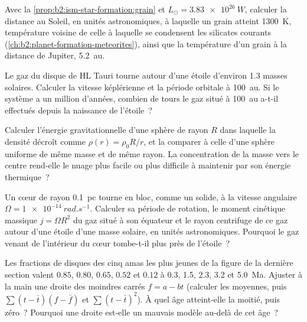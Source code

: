 \begin{exercise}[$\star\star$]\label{exo:b2:ism-star-formation:8}
Avec la \cref{prop:b2:ism-star-formation:grain} et $L_\odot = \qty{3.83e26}{W}$, calculer
la distance au Soleil, en unités astronomiques, à laquelle un grain atteint \qty{1300}{K}, température voisine de celle à laquelle se condensent les silicates courants
(\cref{ch:b2:planet-formation-meteorites}), ainsi que la température d'un grain à la distance de
Jupiter,
\qty{5.2}{au}.
\end{exercise}

\begin{exercise}[$\star\star$]\label{exo:b2:ism-star-formation:9}
Le gaz du disque de HL Tauri tourne autour d'une étoile d'environ \num{1.3} masses
solaires. Calculer la vitesse képlérienne et la période orbitale à \qty{100}{au}. Si le système a un million d'années, combien de tours le gaz situé à \qty{100}{au} a-t-il
effectués depuis la naissance de
l'étoile~?
\end{exercise}

\begin{exercise}[$\star\star\star$]\label{exo:b2:ism-star-formation:10}
Calculer l'énergie gravitationnelle d'une sphère de rayon $R$ dans laquelle la densité
décroît comme $\rho(r) = \rho_0 R/r$, et la comparer à celle d'une sphère uniforme de même masse et de même rayon. La concentration de la masse vers le centre rend-elle le nuage
plus facile ou plus difficile à maintenir par son énergie
thermique~?
\end{exercise}

\begin{exercise}[$\star\star\star$]\label{exo:b2:ism-star-formation:11}
Un cœur de rayon \qty{0.1}{pc} tourne en bloc, comme un solide, à la vitesse angulaire
$\Omega = \qty{1e-14}{rad.s^{-1}}$. Calculer sa période de rotation, le moment cinétique massique $j = \Omega R^2$ du gaz situé à son équateur et le rayon centrifuge de ce
gaz autour d'une étoile d'une masse solaire, en unités astronomiques. Pourquoi le gaz venant de l'intérieur du cœur tombe-t-il plus près
de
l'étoile~?
\end{exercise}

\begin{exercise}[$\star\star\star$]\label{exo:b2:ism-star-formation:12}
Les fractions de disques des cinq amas les plus jeunes de la figure de la dernière
section valent $0.85$, $0.80$, $0.65$, $0.52$ et $0.12$ à 0.3, 1.5, 2.3, 3.2 et \qty{5.0}{Ma}. Ajuster à la main une droite des moindres carrés $f = a - bt$ (calculer
les moyennes, puis $\sum(t - \bar t)(f - \bar f)$ et $\sum(t - \bar t)^2$). À quel âge atteint-elle la moitié, puis zéro~? Pourquoi une droite est-elle un mauvais modèle au-delà
de
cet
âge~?
\end{exercise}

